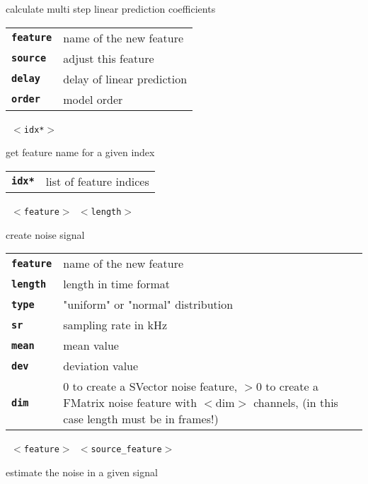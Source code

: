 \begin{description}
\begin{description}
        calculate multi step linear prediction coefficients

      \begin{tabular}{ll}
 \texttt{\textbf{feature}} &  name of the new feature \\
 \texttt{\textbf{source}} &   adjust this feature \\
 \texttt{\textbf{delay}} &     delay of linear prediction  \\
 \texttt{\textbf{order}} &     model order  \\
      \end{tabular}
       \texttt{ $<$idx*$>$} \

        get feature name for a given index

      \begin{tabular}{ll}
 \texttt{\textbf{idx*}} & list of feature indices \\
      \end{tabular}
       \texttt{ $<$feature$>$ $<$length$>$     } \

        create noise signal

      \begin{tabular}{ll}
 \texttt{\textbf{feature}} &  name of the new feature \\
 \texttt{\textbf{length}} &   length in time format  \\
 \texttt{\textbf{type}} &      "uniform" or "normal" distribution  \\
 \texttt{\textbf{sr}} &        sampling rate in kHz  \\
 \texttt{\textbf{mean}} &      mean value  \\
 \texttt{\textbf{dev}} &       deviation value  \\
 \texttt{\textbf{dim}} &       0 to create a SVector noise feature, $>$0 to create a FMatrix noise feature with $<$dim$>$ channels, (in this case length must be in frames!)  \\
      \end{tabular}
       \texttt{ $<$feature$>$ $<$source\_feature$>$      } \

        estimate the noise in a given signal


\end{description}
\end{description}
